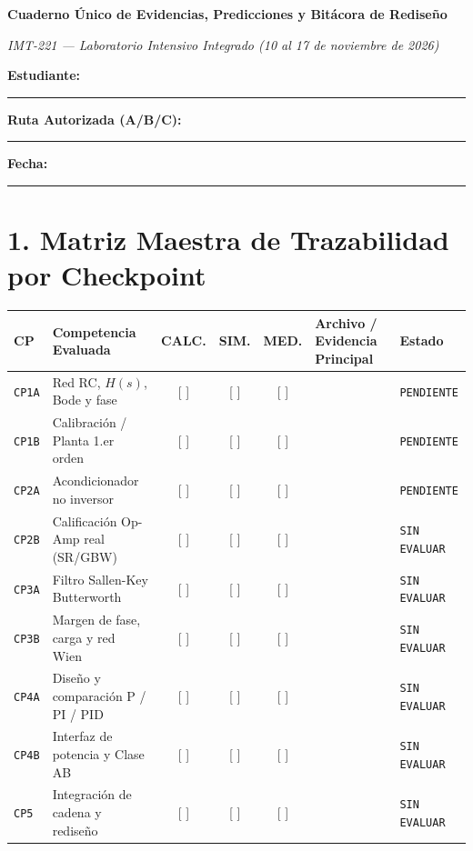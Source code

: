 \documentclass[11pt, a4paper]{article}
\begin{document}
\begin{center}
    {\Large \textbf{Cuaderno Único de Evidencias, Predicciones y Bitácora de Rediseño}}
    \par\vspace{0.1cm}
    \textit{IMT-221 — Laboratorio Intensivo Integrado (10 al 17 de noviembre de 2026)}
\end{center}

\noindent \textbf{Estudiante:} \rule{6.5cm}{0.4pt} \hfill \textbf{Ruta Autorizada (A/B/C):} \rule{1.5cm}{0.4pt} \hfill \textbf{Fecha:} \rule{2.8cm}{0.4pt}

\section*{1. Matriz Maestra de Trazabilidad por Checkpoint}
\begin{center}
\begin{tabularx}{\textwidth}{@{} l l c c c L l @{}}
\toprule
\textbf{CP} & \textbf{Competencia Evaluada} & \textbf{CALC.} & \textbf{SIM.} & \textbf{MED.} & \textbf{Archivo / Evidencia Principal} & \textbf{Estado} \\ \midrule
\texttt{CP1A} & Red RC, $H(s)$, Bode y fase & [ ] & [ ] & [ ] & & \texttt{PENDIENTE} \\ \addlinespace[4pt]
\texttt{CP1B} & Calibración / Planta 1.er orden & [ ] & [ ] & [ ] & & \texttt{PENDIENTE} \\ \addlinespace[4pt]
\texttt{CP2A} & Acondicionador no inversor & [ ] & [ ] & [ ] & & \texttt{PENDIENTE} \\ \addlinespace[4pt]
\texttt{CP2B} & Calificación Op-Amp real (SR/GBW) & [ ] & [ ] & [ ] & & \texttt{SIN EVALUAR} \\ \addlinespace[4pt]
\texttt{CP3A} & Filtro Sallen-Key Butterworth & [ ] & [ ] & [ ] & & \texttt{SIN EVALUAR} \\ \addlinespace[4pt]
\texttt{CP3B} & Margen de fase, carga y red Wien & [ ] & [ ] & [ ] & & \texttt{SIN EVALUAR} \\ \addlinespace[4pt]
\texttt{CP4A} & Diseño y comparación P / PI / PID & [ ] & [ ] & [ ] & & \texttt{SIN EVALUAR} \\ \addlinespace[4pt]
\texttt{CP4B} & Interfaz de potencia y Clase AB & [ ] & [ ] & [ ] & & \texttt{SIN EVALUAR} \\ \addlinespace[4pt]
\texttt{CP5}  & Integración de cadena y rediseño & [ ] & [ ] & [ ] & & \texttt{SIN EVALUAR} \\ \bottomrule
\end{tabularx}
\end{center}
\end{document}
